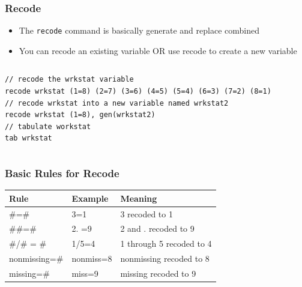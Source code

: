 \documentclass[table]{beamer}
\begin{document}
\begin{frame}[fragile]
\frametitle{Recode}
\label{sec-2-4}

\begin{itemize}
\item The \verb~recode~ command is basically generate and replace combined
\item You can recode an existing variable OR use recode to create a new variable
\end{itemize}

\vspace{-.5em} \begin{columns}  \begin{block}{}

\begin{verbatim}
// recode the wrkstat variable 
recode wrkstat (1=8) (2=7) (3=6) (4=5) (5=4) (6=3) (7=2) (8=1)
// recode wrkstat into a new variable named wrkstat2
recode wrkstat (1=8), gen(wrkstat2)
// tabulate workstat
tab wrkstat
\end{verbatim}
\end{block} \end{columns}
\end{frame}
\begin{frame}
\frametitle{Basic Rules for Recode}
\label{sec-2-5}


\begin{center}
\begin{tabular}{lll}
 Rule           &  Example    &  Meaning                   \\
\hline
 \#=\#          &  3=1        &  3 recoded to 1            \\
 \#\#=\#        &  2. =9      &  2 and . recoded to 9      \\
 \#/\# = \#     &  1/5=4      &  1 through 5 recoded to 4  \\
 nonmissing=\#  &  nonmiss=8  &  nonmissing recoded to 8   \\
 missing=\#     &  miss=9     &  missing recoded to 9      \\
\end{tabular}
\end{center}
\end{frame}
\end{document}
